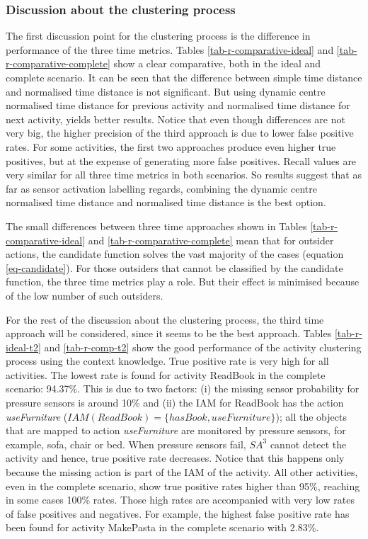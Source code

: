 \subsubsection{Discussion about the clustering process}
\label{subsubsec:evaluation:ac:discussion}

The first discussion point for the clustering process is the difference in performance of the three time metrics. Tables \ref{tab-r-comparative-ideal} and \ref{tab-r-comparative-complete} show a clear comparative, both in the ideal and complete scenario. It can be seen that the difference between simple time distance and normalised time distance is not significant. But using dynamic centre normalised time distance for previous activity and normalised time distance for next activity, yields better results. Notice that even though differences are not very big, the higher precision of the third approach is due to lower false positive rates. For some activities, the first two approaches produce even higher true positives, but at the expense of generating more false positives. Recall values are very similar for all three time metrics in both scenarios. So results suggest that as far as sensor activation labelling regards, combining the dynamic centre normalised time distance and normalised time distance is the best option.

The small differences between three time approaches shown in Tables \ref{tab-r-comparative-ideal} and \ref{tab-r-comparative-complete} mean that for outsider actions, the candidate function solves the vast majority of the cases (equation \ref{eq-candidate}). For those outsiders that cannot be classified by the candidate function, the three time metrics play a role. But their effect is minimised because of the low number of such outsiders.

For the rest of the discussion about the clustering process, the third time approach will be considered, since it seems to be the best approach. Tables \ref{tab-r-ideal-t2} and \ref{tab-r-comp-t2} show the good performance of the activity clustering process using the context knowledge. True positive rate is very high for all activities. The lowest rate is found for activity ReadBook in the complete scenario: 94.37\%. This is due to two factors: (i) the missing sensor probability for pressure sensors is around 10\% and (ii) the IAM for ReadBook has the action \textit{useFurniture} ($IAM(ReadBook) = \{hasBook, useFurniture\}$); all the objects that are mapped to action \textit{useFurniture} are monitored by pressure sensors, for example, sofa, chair or bed. When pressure sensors fail, $SA^3$ cannot detect the activity and hence, true positive rate decreases. Notice that this happens only because the missing action is part of the IAM of the activity. All other activities, even in the complete scenario, show true positive rates higher than 95\%, reaching in some cases 100\% rates. Those high rates are accompanied with very low rates of false positives and negatives. For example, the highest false positive rate has been found for activity MakePasta in the complete scenario with 2.83\%. 

